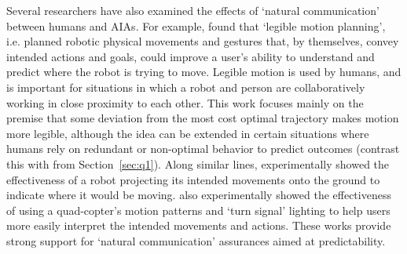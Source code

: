 Several researchers have also examined the effects of `natural communication' between humans and AIAs. %
For example, \citet{Dragan2013-wd} found that `legible motion planning', i.e. planned robotic physical movements and gestures that, by themselves, convey intended actions and goals, could improve a user's ability to understand and predict where the robot is trying to move. 
Legible motion is used by humans, and is important for situations in which a robot and person are collaboratively working in close proximity to each other. %
This work focuses mainly on the premise that some deviation from the most cost optimal trajectory makes motion more legible, although the idea can be extended in certain situations where humans rely on redundant or non-optimal behavior to predict outcomes (contrast this with \citet{Wu2016-ei} from Section~\ref{sec:q1}). 
Along similar lines, \citet{Chadalavada2015-wx} experimentally showed the effectiveness of a robot projecting its intended movements onto the ground to indicate where it would be moving.  %
\citet{Szafir2014-ok} also experimentally showed the effectiveness of using a quad-copter's motion patterns and `turn signal' lighting to help users more easily interpret the intended movements and actions. 
These works provide strong support for `natural communication' assurances aimed at predictability. 

